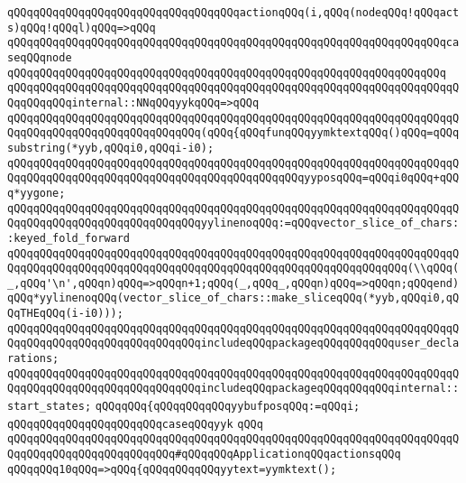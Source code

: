 \verb|qQQqqQQqqQQqqQQqqQQqqQQqqQQqqQQqqQQqactionqQQq(i,qQQq(nodeqQQq!qQQqacts)qQQq!qQQql)qQQq=>qQQq|\newline
\verb|qQQqqQQqqQQqqQQqqQQqqQQqqQQqqQQqqQQqqQQqqQQqqQQqqQQqqQQqqQQqqQQqqQQqcaseqQQqnode|\newline
\verb|qQQqqQQqqQQqqQQqqQQqqQQqqQQqqQQqqQQqqQQqqQQqqQQqqQQqqQQqqQQqqQQqqQQq|\newline
\verb|qQQqqQQqqQQqqQQqqQQqqQQqqQQqqQQqqQQqqQQqqQQqqQQqqQQqqQQqqQQqqQQqqQQqqQQqqQQqqQQqinternal::NNqQQqyykqQQq=>qQQq|\newline
\verb|qQQqqQQqqQQqqQQqqQQqqQQqqQQqqQQqqQQqqQQqqQQqqQQqqQQqqQQqqQQqqQQqqQQqqQQqqQQqqQQqqQQqqQQqqQQqqQQqqQQq(qQQq{qQQqfunqQQqyymktextqQQq()qQQq=qQQqsubstring(*yyb,qQQqi0,qQQqi-i0);|\newline
\verb|qQQqqQQqqQQqqQQqqQQqqQQqqQQqqQQqqQQqqQQqqQQqqQQqqQQqqQQqqQQqqQQqqQQqqQQqqQQqqQQqqQQqqQQqqQQqqQQqqQQqqQQqqQQqqQQqqQQqyyposqQQq=qQQqi0qQQq+qQQq*yygone;|\newline
\verb|qQQqqQQqqQQqqQQqqQQqqQQqqQQqqQQqqQQqqQQqqQQqqQQqqQQqqQQqqQQqqQQqqQQqqQQqqQQqqQQqqQQqqQQqqQQqqQQqqQQqyylinenoqQQq:=qQQqvector_slice_of_chars::keyed_fold_forward|\newline
\verb|qQQqqQQqqQQqqQQqqQQqqQQqqQQqqQQqqQQqqQQqqQQqqQQqqQQqqQQqqQQqqQQqqQQqqQQqqQQqqQQqqQQqqQQqqQQqqQQqqQQqqQQqqQQqqQQqqQQqqQQqqQQqqQQqqQQq(\\qQQq(_,qQQq'\n',qQQqn)qQQq=>qQQqn+1;qQQq(_,qQQq_,qQQqn)qQQq=>qQQqn;qQQqend)qQQq*yylinenoqQQq(vector_slice_of_chars::make_sliceqQQq(*yyb,qQQqi0,qQQqTHEqQQq(i-i0)));|\newline
\verb|qQQqqQQqqQQqqQQqqQQqqQQqqQQqqQQqqQQqqQQqqQQqqQQqqQQqqQQqqQQqqQQqqQQqqQQqqQQqqQQqqQQqqQQqqQQqqQQqqQQqincludeqQQqpackageqQQqqQQqqQQquser_declarations;|\newline
\verb|qQQqqQQqqQQqqQQqqQQqqQQqqQQqqQQqqQQqqQQqqQQqqQQqqQQqqQQqqQQqqQQqqQQqqQQqqQQqqQQqqQQqqQQqqQQqqQQqqQQqincludeqQQqpackageqQQqqQQqqQQqinternal::start_states;|\newline
\verb|qQQqqQQq{qQQqqQQqqQQqyybufposqQQq:=qQQqi;|\newline
\verb|qQQqqQQqqQQqqQQqqQQqqQQqcaseqQQqyyk|\newline
\verb|qQQq|\newline
\newline
\verb|qQQqqQQqqQQqqQQqqQQqqQQqqQQqqQQqqQQqqQQqqQQqqQQqqQQqqQQqqQQqqQQqqQQqqQQqqQQqqQQqqQQqqQQqqQQqqQQq#qQQqqQQqApplicationqQQqactionsqQQq|\newline
\newline
\verb|qQQqqQQq10qQQq=>qQQq{qQQqqQQqqQQqyytext=yymktext();|\newline
